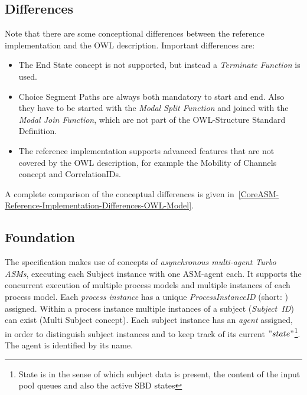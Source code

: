 \subsection{Differences}

Note that there are some conceptional differences between the reference implementation and the OWL description. Important differences are:

\begin{itemize}
    \item The End State concept is not supported, but instead a \textit{Terminate Function} is used.
    \item Choice Segment Paths are always both mandatory to start and end. Also they have to be started with the \textit{Modal Split Function} and joined with the \textit{Modal Join Function}, which are not part of the OWL-Structure Standard Definition.
    \item The reference implementation supports advanced features that are not covered by the OWL description, for example the Mobility of Channels concept and CorrelationIDs.
\end{itemize}

A complete comparison of the conceptual differences is given in~\ref{CoreASM-Reference-Implementation-Differences-OWL-Model}.



\subsection{Foundation}

The specification makes use of concepts of \textit{asynchronous multi-agent Turbo ASMs}, executing each Subject instance with one ASM-agent each. It supports the concurrent execution of multiple process models and multiple instances of each process model. 
Each \textit{process instance} has a unique \textit{ProcessInstanceID} (short: ) assigned. 
Within a process instance multiple instances of a subject (\textit{Subject~ID}) can exist (Multi Subject concept). Each subject instance has an \textit{agent} assigned, in order to distinguish subject instances and to keep track of its current $"state"$\footnote{State is in the sense of which subject data is present, the content of the input pool queues and also the active SBD states}. The agent is identified by its name.

